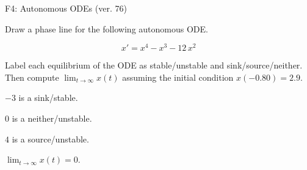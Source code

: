 \begin{exercise}
  \begin{exerciseTitle}F4: Autonomous ODEs (ver. 76)\end{exerciseTitle}
  \begin{exerciseStatement}
    

      Draw a phase line for the following 
      autonomous ODE.
    

    
\[x'= x^{4} - x^{3} - 12 \, x^{2}\]

    

      Label each equilibrium of the ODE
      as stable/unstable and sink/source/neither.
      Then compute \(\lim_{t\to\infty}x(t)\)
      assuming the initial condition
      \(x( -0.80 )= 2.9\).
    

  \end{exerciseStatement}
  \begin{exerciseAnswer}
    

      \(-3\) is a sink/stable.
      
        \(0\) is a neither/unstable.
      
      \(4\) is a source/unstable.
    

    

      \(\lim_{t\to\infty}x(t)=0\).
    

  \end{exerciseAnswer}
\end{exercise}